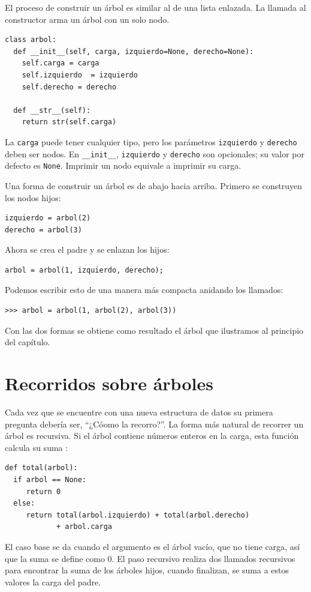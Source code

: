 El proceso de construir un árbol es similar al de
una lista enlazada. La llamada al constructor arma un árbol con un solo nodo.

\beforeverb
\begin{verbatim}
class arbol:
  def __init__(self, carga, izquierdo=None, derecho=None):
    self.carga = carga
    self.izquierdo  = izquierdo
    self.derecho = derecho

  def __str__(self):
    return str(self.carga)
\end{verbatim}
\afterverb
%
La \texttt{carga} puede tener cualquier tipo, pero los
parámetros  \texttt{izquierdo} y \texttt{derecho} deben ser
nodos. En  \texttt{\_\_init\_\_}, \texttt{izquierdo} y \texttt{derecho} 
son opcionales;  su valor por defecto es \texttt{None}. Imprimir un nodo equivale a imprimir su carga.

Una forma de construir un árbol es de abajo hacia arriba. Primero se
construyen los nodos hijos:

\beforeverb
\begin{verbatim}
izquierdo = arbol(2)
derecho = arbol(3)
\end{verbatim}
\afterverb
%
Ahora se crea el padre y se enlazan los hijos:

\beforeverb
\begin{verbatim}
arbol = arbol(1, izquierdo, derecho);
\end{verbatim}
\afterverb
%
Podemos escribir esto de una manera más compacta 
anidando los llamados:

\beforeverb
\begin{verbatim}
>>> arbol = arbol(1, arbol(2), arbol(3))
\end{verbatim}
\afterverb
%
Con las dos formas se obtiene como resultado el árbol que 
ilustramos al principio del capítulo.


\section {Recorridos sobre árboles}

Cada vez que se encuentre con una nueva estructura de datos
su primera pregunta debería ser,  ``¿Cóomo la recorro?''. La
forma más natural de recorrer un árbol es recursiva. Si el 
árbol contiene números enteros en la carga, esta función calcula
su suma :

\beforeverb
\begin{verbatim}
def total(arbol):
  if arbol == None: 
     return 0
  else:
     return total(arbol.izquierdo) + total(arbol.derecho) 
            + arbol.carga
\end{verbatim}
\afterverb
%
El caso base se da cuando el argumento es el árbol vacío, que no 
tiene carga, así que la suma se define como 0. El paso recursivo
realiza dos llamados recursivos para encontrar la suma de los árboles
hijos, cuando finalizan, se suma a estos valores la carga del
padre.


